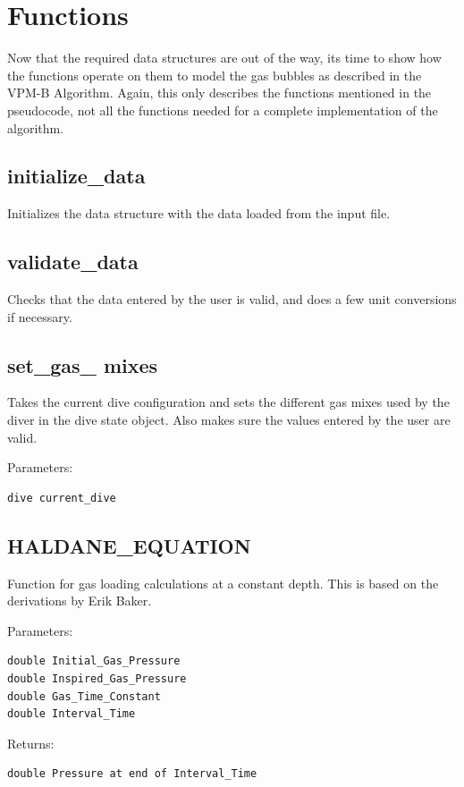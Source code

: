 \documentclass[12pt]{article}
\begin{document}
\newpage
\section{Functions}

Now that the required data structures are out of the way, its time to show how the functions operate
on them to model the gas bubbles as described in the VPM-B Algorithm. Again, this only describes the
functions mentioned in the pseudocode, not all the functions needed for a complete implementation
of the algorithm.

\subsection{initialize\_data}
Initializes the data structure with the data loaded from the input file.

\subsection{validate\_data}
Checks that the data entered by the user is valid, and does a few unit conversions if necessary.


\subsection{set\_gas\_ mixes}
Takes the current dive configuration and sets the different gas mixes used by the diver in the 
dive state object. Also makes sure the values entered by the user are valid.

Parameters:
\begin{verbatim}
dive current_dive
\end{verbatim}

\subsection{HALDANE\_EQUATION}
\label{par:haldane}

Function for gas loading calculations at a constant depth. This is based on the derivations
by Erik Baker\cite{baker_deriv}.

Parameters:
\begin{verbatim}
double Initial_Gas_Pressure
double Inspired_Gas_Pressure
double Gas_Time_Constant
double Interval_Time
\end{verbatim}

Returns:
\begin{verbatim}
double Pressure at end of Interval_Time
\end{verbatim}
\end{document}
